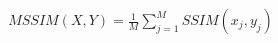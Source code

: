 \documentclass[preview]{standalone}
\begin{document}
\begin{align*}
MSSIM(X,Y) = \frac{1}{M}\sum_{j=1}^{M}SSIM(x_j, y_j)
\end{align*}
\end{document}
